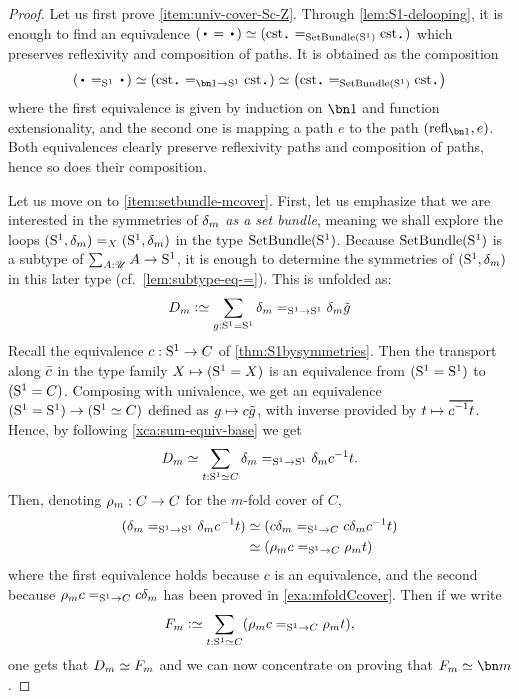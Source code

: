 \begin{proof}
  Let us first prove \ref{item:univ-cover-Sc-Z}. Through
  \cref{lem:S1-delooping}, it is enough to find an equivalence
  $(\base = \base) \weq (\cst\base =_{\SetBundle(\Sc)} \cst\base)$
  which preserves reflexivity and composition of paths. It is obtained
  as the composition
  \begin{displaymath}
    \left(\base =_{\Sc} \base\right) \weq \left( \cst\base=_{\bn 1\to \Sc}\cst\base \right)
    \weq \left( \cst\base =_{\SetBundle(\Sc)} \cst\base \right)
  \end{displaymath}
  where the first equivalence is given by induction on $\bn 1$ and
  function extensionality, and the second one is mapping a path $e$ to
  the path $(\refl{\bn 1}, e)$. Both equivalences clearly preserve
  reflexivity paths and composition of paths, hence so does their
  composition.

  Let us move on to \ref{item:setbundle-mcover}. %
  First, let us emphasize that we are interested in the symmetries of
  $\delta_{m}$ \emph{as a set bundle}, meaning we shall explore
  the loops $({\mathrm{S}^1},\delta_{m}) =_X ({\mathrm{S}^1},\delta_{m})$ in the type
  $\mathrm{SetBundle}({\mathrm{S}^1})$.
  Because $\mathrm{SetBundle}({\mathrm{S}^1})$ is a subtype of $\sum_{A:{\mathscr{U}}}A\to {\mathrm{S}^1}$, it
  is enough to determine the symmetries of $({\mathrm{S}^1},\delta_{m})$ in this later
  type (cf.\ \cref{lem:subtype-eq-=}). This is unfolded as:
  \begin{displaymath}
    D_m \defequi \sum_{g:\Sc = \Sc}\dg{m} =_{\Sc \to \Sc} \dg{m}\ptoe g
  \end{displaymath}
  Recall the equivalence $c: {\mathrm{S}^1} \to C$ of
  \cref{thm:S1bysymmetries}. Then the transport along $\bar {c}$ in the
  type family $X\mapsto ({\mathrm{S}^1}=X)$ is an equivalence from $({\mathrm{S}^1} = {\mathrm{S}^1})$
  to $({\mathrm{S}^1} = C)$. Composing with univalence, we get an
  equivalence $({\mathrm{S}^1}={\mathrm{S}^1}) \to ({\mathrm{S}^1} \simeq C)$ defined as
  $g\mapsto c\tilde {g}$, with inverse provided by
  $t \mapsto \overetop{\inv{c} t}$.
  Hence, by following \cref{xca:sum-equiv-base} we get
  \begin{displaymath}
    D_m \simeq  \sum_{t:{\mathrm{S}^1} \simeq C} \delta_{m} =_{{\mathrm{S}^1}\to {\mathrm{S}^1}} \delta_{m}c^{-1} t.
  \end{displaymath}
  Then, denoting $\rho_{m}: C \to C$ for the $m$-fold cover of $C$,
  \begin{displaymath}
    \begin{split}
      (\dg{m} =_{\Sc\to \Sc} \dg{m}\inv c t) %
      &\weq (c \dg{m} =_{\Sc\to C} c \dg{m} \inv c t)
      \\
      &\weq (\cdg{m}c =_{\Sc\to C} \cdg{m} t)
    \end{split}
  \end{displaymath}
  where the first equivalence holds because $c$ is an equivalence, and
  the second because $\rho_{m}c =_{{\mathrm{S}^1}\to C} c \delta_{m}$ has been
  proved in \cref{exa:mfoldCcover}.
  Then if we write
  \begin{displaymath}
    F_m \defequi \sum_{t:\Sc \weq C}(\cdg{m}c =_{\Sc\to C} \cdg{m} t),
  \end{displaymath}
  one gets that $D_m \simeq F_m$ and we can now concentrate on proving that
  $F_m \weq \bn m$.


\end{proof}
